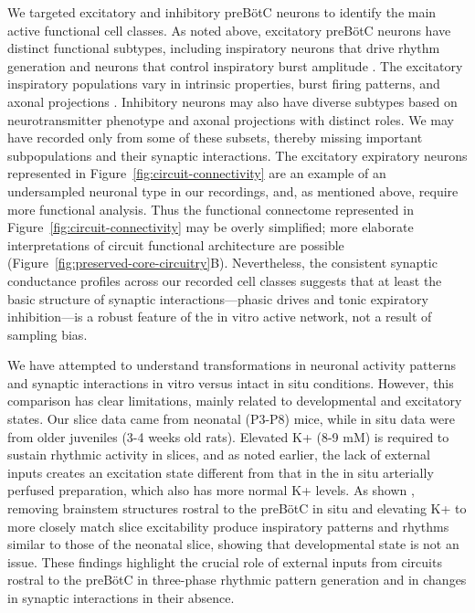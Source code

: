 \documentclass[
]{article}
\newcommand{\figref}[1]{Figure~\ref{#1}}
\newcommand{\figpanelref}[2]{Figure~\ref{#1}#2}
\begin{document}
We targeted excitatory and inhibitory preBötC neurons to identify the main active functional cell classes. As noted above, excitatory preBötC neurons have distinct functional subtypes, including inspiratory neurons that drive rhythm generation and neurons that control inspiratory burst amplitude \citep{phillips2019biophysical,phillips2022predictions}. The excitatory inspiratory populations vary in intrinsic properties, burst firing patterns, and axonal projections \citep{koizumi2013structural}. Inhibitory neurons may also have diverse subtypes based on neurotransmitter phenotype and axonal projections \citep{koizumi2013structural} with distinct roles. We may have recorded only from some of these subsets, thereby missing important subpopulations and their synaptic interactions. The excitatory expiratory neurons represented in \figref{fig:circuit-connectivity} are an example of an undersampled neuronal type in our recordings, and, as mentioned above, require more functional analysis. Thus the functional connectome represented in \figref{fig:circuit-connectivity} may be overly simplified; more elaborate interpretations of circuit functional architecture are possible (\figpanelref{fig:preserved-core-circuitry}{B}). Nevertheless, the consistent synaptic conductance profiles across our recorded cell classes suggests that at least the basic structure of synaptic interactions---phasic drives and tonic expiratory inhibition---is a robust feature of the in vitro active network, not a result of sampling bias.

We have attempted to understand transformations in neuronal activity patterns and synaptic interactions in vitro versus intact in situ conditions. However, this comparison has clear limitations, mainly related to developmental and excitatory states. Our slice data came from neonatal (P3-P8) mice, while in situ data were from older juveniles (3-4 weeks old rats). Elevated K+ (8-9 mM) is required to sustain rhythmic activity in slices, and as noted earlier, the lack of external inputs creates an excitation state different from that in the in situ arterially perfused preparation, which also has more normal K+ levels. As shown \citep{smith2007spatial}, removing brainstem structures rostral to the preBötC in situ and elevating K+ to more closely match slice excitability produce inspiratory patterns and rhythms similar to those of the neonatal slice, showing that developmental state is not an issue. These findings highlight the crucial role of external inputs from circuits rostral to the preBötC in three-phase rhythmic pattern generation and in changes in synaptic interactions in their absence.
\end{document}
